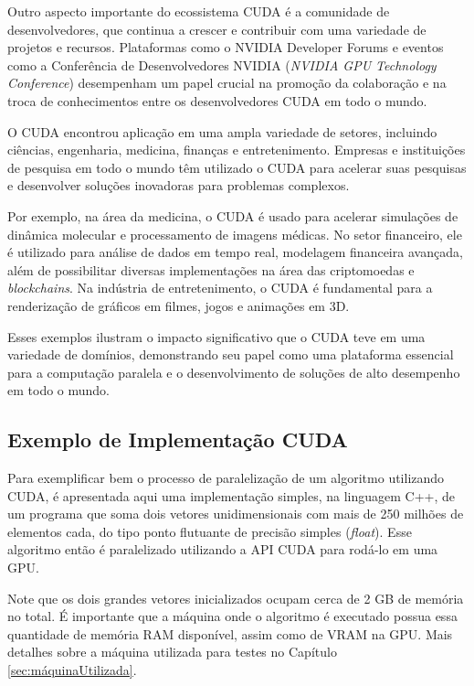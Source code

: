 \documentclass[12pt,
openright, 
oneside, %
a4paper,    %
brazil]{facom-ufu-abntex2}
\begin{document}
Outro aspecto importante do ecossistema CUDA é a comunidade de desenvolvedores, que continua a crescer e contribuir com uma variedade de projetos e recursos. Plataformas como o NVIDIA Developer Forums e eventos como a Conferência de Desenvolvedores NVIDIA (\textit{NVIDIA GPU Technology Conference}) desempenham um papel crucial na promoção da colaboração e na troca de conhecimentos entre os desenvolvedores CUDA em todo o mundo.

O CUDA encontrou aplicação em uma ampla variedade de setores, incluindo ciências, engenharia, medicina, finanças e entretenimento. Empresas e instituições de pesquisa em todo o mundo têm utilizado o CUDA para acelerar suas pesquisas e desenvolver soluções inovadoras para problemas complexos.

Por exemplo, na área da medicina, o CUDA é usado para acelerar simulações de dinâmica molecular e processamento de imagens médicas. No setor financeiro, ele é utilizado para análise de dados em tempo real, modelagem financeira avançada, além de possibilitar diversas implementações na área das criptomoedas e \textit{blockchains}. Na indústria de entretenimento, o CUDA é fundamental para a renderização de gráficos em filmes, jogos e animações em 3D.

Esses exemplos ilustram o impacto significativo que o CUDA teve em uma variedade de domínios, demonstrando seu papel como uma plataforma essencial para a computação paralela e o desenvolvimento de soluções de alto desempenho em todo o mundo.


\subsection{Exemplo de Implementação CUDA}
\label{ssc:implementaçãoCUDA}

Para exemplificar bem o processo de paralelização de um algoritmo utilizando CUDA, é apresentada aqui uma implementação simples, na linguagem C++, de um programa que soma dois vetores unidimensionais com mais de 250 milhões de elementos cada, do tipo ponto flutuante de precisão simples (\textit{float}). Esse algoritmo então é paralelizado utilizando a API CUDA para rodá-lo em uma GPU.

Note que os dois grandes vetores inicializados ocupam cerca de 2 GB de memória no total. É importante que a máquina onde o algoritmo é executado possua essa quantidade de memória RAM disponível, assim como de VRAM na GPU. Mais detalhes sobre a máquina utilizada para testes no Capítulo \ref{sec:máquinaUtilizada}.
\end{document}
